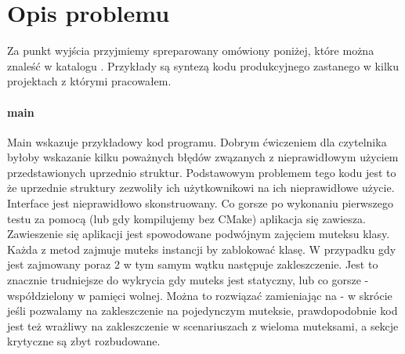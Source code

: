\section{Opis problemu}\label{sec:problem-desc}
Za punkt wyjścia przyjmiemy spreparowany omówiony poniżej, które można znaleść w katalogu  . Przykłady są syntezą kodu produkcyjnego zastanego w kilku projektach z którymi pracowałem.

\paragraph{main}
Main wskazuje przykładowy kod programu. Dobrym ćwiczeniem dla czytelnika byłoby wskazanie kilku poważnych błędów zwązanych z nieprawidłowym użyciem przedstawionych uprzednio struktur.
Podstawowym problemem tego kodu jest to że uprzednie struktury zezwoliły ich użytkownikowi na ich nieprawidłowe użycie. Interface jest nieprawidłowo skonstruowany. Co gorsze po wykonaniu pierwszego testu za pomocą  (lub  gdy kompilujemy bez CMake) aplikacja się zawiesza.
Zawieszenie się aplikacji jest spowodowane podwójnym zajęciem muteksu klasy. Każda z metod zajmuje muteks instancji by zablokować klasę. W przypadku gdy  jest zajmowany poraz 2 w tym samym wątku następuje zakleszczenie. Jest to znacznie trudniejsze do wykrycia gdy muteks jest statyczny, lub co gorsze - współdzielony w pamięci wolnej. Można to rozwiązać zamieniając  na   - w skrócie jeśli pozwalamy na zakleszczenie na pojedynczym muteksie, prawdopodobnie kod jest też wrażliwy na zakleszczenie w scenariuszach z wieloma muteksami, a sekcje krytyczne są zbyt rozbudowane.


